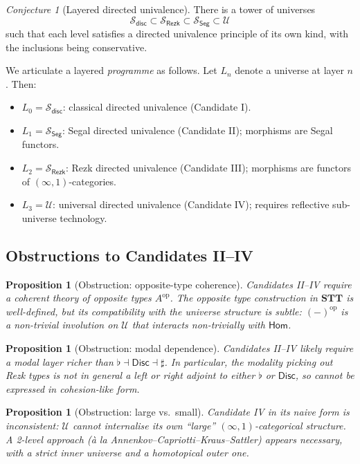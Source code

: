 \documentclass[12pt]{article}
\newtheorem{proposition}[theorem]{Proposition}
\theoremstyle{definition}
\theoremstyle{remark}
\newtheorem{conjecture}[theorem]{Conjecture}
\newcommand{\U}{\mathcal{U}}
\newcommand{\Hom}{\mathsf{Hom}}
\newcommand{\op}{\mathrm{op}}
\newcommand{\disc}{\mathsf{disc}}
\newcommand{\Disc}{\mathsf{Disc}}
\newcommand{\STT}{\mathbf{STT}}
\begin{document}
\begin{conjecture}[Layered directed univalence]\label{conj:layered}
There is a tower of universes
\[
\mathcal{S}_{\disc} \subset \mathcal{S}_{\mathsf{Rezk}} \subset \mathcal{S}_{\mathsf{Seg}} \subset \U
\]
such that each level satisfies a directed univalence principle of its own kind, with the inclusions being conservative.
\end{conjecture}

We articulate a layered \emph{programme} as follows. Let $L_n$ denote a universe at layer $n$. Then:
\begin{itemize}
\item $L_0 = \mathcal{S}_{\disc}$: classical directed univalence (Candidate I).
\item $L_1 = \mathcal{S}_{\mathsf{Seg}}$: Segal directed univalence (Candidate II); morphisms are Segal functors.
\item $L_2 = \mathcal{S}_{\mathsf{Rezk}}$: Rezk directed univalence (Candidate III); morphisms are functors of $(\infty,1)$-categories.
\item $L_3 = \U$: universal directed univalence (Candidate IV); requires reflective sub-universe technology.
\end{itemize}

\subsection{Obstructions to Candidates II--IV}

\begin{proposition}[Obstruction: opposite-type coherence]\label{prop:opp-coh}
Candidates II--IV require a coherent theory of opposite types $A^{\op}$. The opposite type construction in $\STT$ is well-defined, but its compatibility with the universe structure is subtle: ${(-)}^{\op}$ is a non-trivial involution on $\U$ that interacts non-trivially with $\Hom$.
\end{proposition}

\begin{proposition}[Obstruction: modal dependence]\label{prop:modal-dep}
Candidates II--IV likely require a modal layer richer than $\flat \dashv \Disc \dashv \sharp$. In particular, the modality picking out Rezk types is not in general a left or right adjoint to either $\flat$ or $\Disc$, so cannot be expressed in cohesion-like form.
\end{proposition}

\begin{proposition}[Obstruction: large vs.\ small]\label{prop:large}
Candidate IV in its naive form is inconsistent: $\U$ cannot internalise its own ``large'' $(\infty,1)$-categorical structure. A 2-level approach (\`a la Annenkov--Capriotti--Kraus--Sattler) appears necessary, with a strict inner universe and a homotopical outer one.
\end{proposition}
\end{document}
